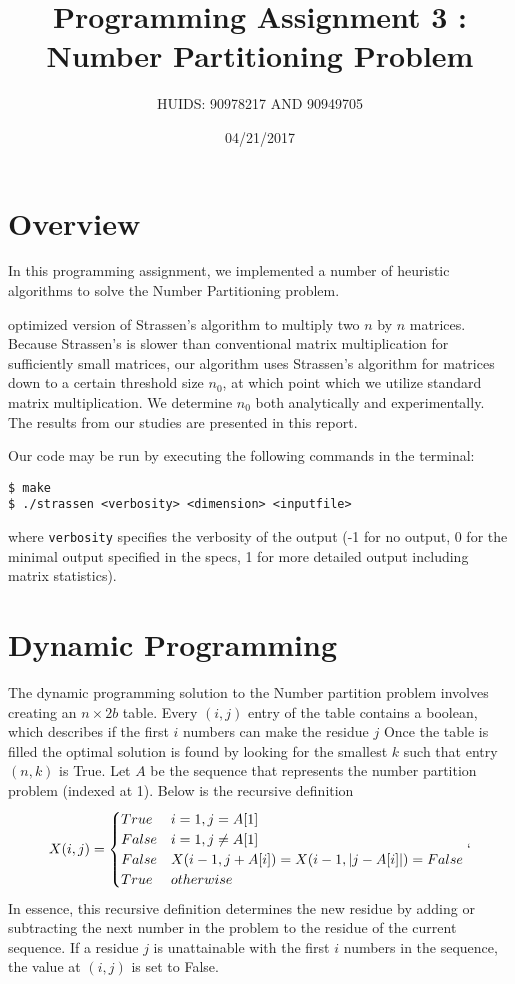 \documentclass[a4paper]{article}
\title{Programming Assignment 3 : Number Partitioning Problem}
\author{HUIDS: 90978217 AND 90949705}
\date{04/21/2017}
\begin{document}
\maketitle

\section{Overview}
In this programming assignment, we implemented a number of heuristic algorithms to solve the Number Partitioning problem.

 optimized version of Strassen's algorithm to multiply two $n$ by $n$ matrices. Because Strassen's is slower than conventional matrix multiplication for sufficiently small matrices, our algorithm uses Strassen's algorithm for matrices down to a certain threshold size $n_0$, at which point which we utilize standard matrix multiplication. We determine $n_0$ both analytically and experimentally. The results from our studies are presented in this report.

Our code may be run by executing the following commands in the terminal:
\begin{verbatim}
$ make
$ ./strassen <verbosity> <dimension> <inputfile>
\end{verbatim}
where \texttt{verbosity} specifies the verbosity of the output (-1 for no output, 0 for the minimal output specified in the specs, 1 for more detailed output including matrix statistics).

\section{Dynamic Programming}
	The dynamic programming solution to the Number partition problem involves creating an $n \times 2b$ table. Every $(i,j)$ entry of the table contains a boolean, which describes if the first $i$ numbers can make the residue $j$  Once the table is filled the optimal solution is found by looking for the smallest $k$ such that entry $(n,k)$ is True. Let $A$ be the sequence that represents the number partition problem (indexed at 1). Below is the recursive definition
	\[X(i,j) = 
	\begin{cases}
	 True & i = 1, j = A[1]\\
	 False & i = 1, j \neq A[1] \\ 
	 False & X(i-1, j + A[i]) = X(i-1, |j - A[i]|) = False \\
	 True & otherwise
	\end{cases}`
	\]
	In essence, this recursive definition determines the new residue by adding or subtracting the next number in the problem to the residue of the current sequence. If a residue $j$ is unattainable with the first $i$ numbers in the sequence, the value at $(i,j)$ is set to False. 
	
\end{document}
